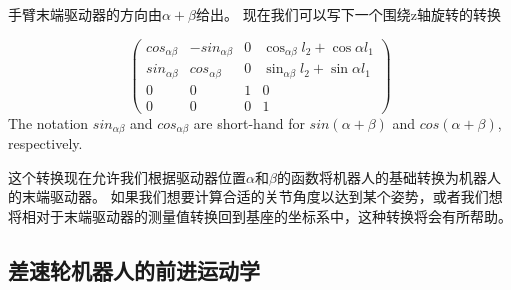 
手臂末端驱动器的方向由$ \alpha + \beta $给出。 现在我们可以写下一个围绕z轴旋转的转换

\begin{equation}
\label{eq:2armtrans}
\left(\begin{array}{llll}cos_{\alpha\beta} & -sin_{\alpha\beta} &  0 & \cos_{\alpha\beta}l_2+\cos\alpha l_1\\
                        sin_{\alpha\beta} & cos_{\alpha\beta} & 0 & \sin_{\alpha\beta}l_2+\sin\alpha l_1\\
												0 & 0 & 1 & 0\\
												0 & 0 & 0 & 1\end{array}\right)
\end{equation}
The notation $sin_{\alpha\beta}$ and $cos_{\alpha\beta}$ are short-hand for $sin(\alpha+\beta)$ and $cos(\alpha+\beta)$, respectively.


这个转换现在允许我们根据驱动器位置$ \alpha $和$ \beta $的函数将机器人的基础转换为机器人的末端驱动器。 如果我们想要计算合适的关节角度以达到某个姿势，或者我们想将相对于末端驱动器的测量值转换回到基座的坐标系中，这种转换将会有所帮助。

\subsection{差速轮机器人的前进运动学}
\label{sec:fwkmobile}


